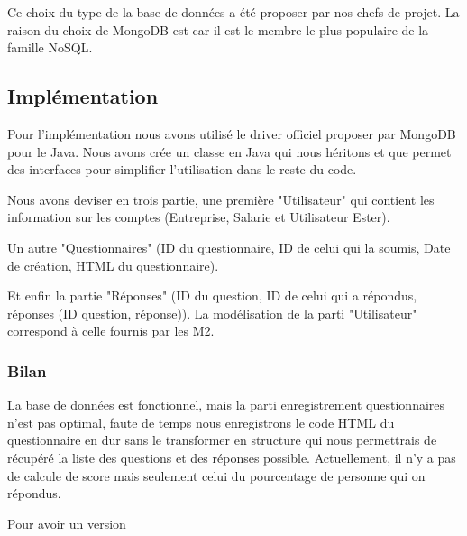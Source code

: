Ce choix du type de la base de données a été proposer par nos chefs de projet. La raison du choix de MongoDB est car il est le membre le plus populaire de la famille NoSQL.   

\subsection{Implémentation}

Pour l'implémentation nous avons utilisé le driver officiel proposer par MongoDB pour le Java. Nous avons crée un classe en Java qui nous héritons et que permet des interfaces pour simplifier l'utilisation dans le reste du code.

Nous avons deviser en trois partie, une première "Utilisateur" qui contient les information sur les comptes (Entreprise, Salarie et Utilisateur Ester).

Un autre "Questionnaires" (ID du questionnaire, ID de celui qui la soumis, Date de création, HTML du questionnaire). 

Et enfin la partie "Réponses" (ID du question, ID de celui qui a répondus, réponses (ID question, réponse)). La modélisation de la parti "Utilisateur" correspond à celle fournis par les M2.

\subsubsection{Bilan}

La base de données est fonctionnel, mais la parti enregistrement questionnaires n'est pas optimal, faute de temps nous enregistrons le code HTML du questionnaire en dur sans le transformer en structure qui nous permettrais de récupéré la liste des questions et des réponses possible. Actuellement, il n'y a pas de calcule de score mais seulement celui du pourcentage de personne qui on répondus.

Pour avoir un version 

